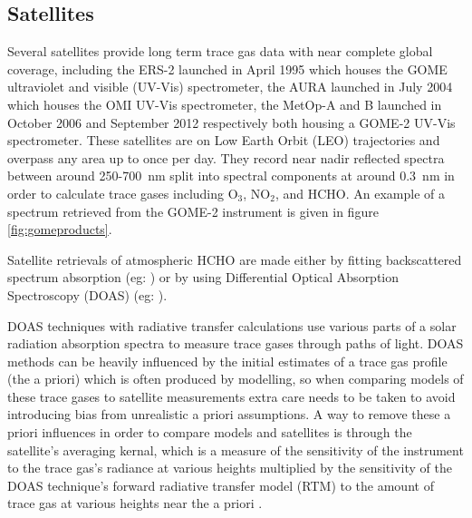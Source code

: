 \subsection{Satellites}

Several satellites provide long term trace gas data with near complete global coverage, including the ERS-2 launched in April 1995 which houses the GOME ultraviolet and visible (UV-Vis) spectrometer, the AURA launched in July 2004 which houses the OMI UV-Vis spectrometer, the MetOp-A and B launched in October 2006 and September 2012 respectively both housing a GOME-2 UV-Vis spectrometer.
These satellites are on Low Earth Orbit (LEO) trajectories and overpass any area up to once per day. 
They record near nadir reflected spectra between around 250-700~nm split into spectral components at around $0.3$~nm in order to calculate trace gases including O$_3$, NO$_2$, and HCHO.
An example of a spectrum retrieved from the GOME-2 instrument is given in figure \ref{fig:gomeproducts}.

Satellite retrievals of atmospheric HCHO are made either by fitting backscattered spectrum absorption (eg: \citet{Chance_2000}) or by using Differential Optical Absorption Spectroscopy (DOAS) (eg: \cite{Leue_2001}).

DOAS techniques with radiative transfer calculations use various parts of a solar radiation absorption spectra to measure trace gases through paths of light.
DOAS methods can be heavily influenced by the initial estimates of a trace gas profile (the a priori) which is often produced by modelling, so when comparing models of these trace gases to satellite measurements extra care needs to be taken to avoid introducing bias from unrealistic a priori assumptions.
A way to remove these a priori influences in order to compare models and satellites is through the satellite's averaging kernal, which is a measure of the sensitivity of the instrument to the trace gas's radiance at various heights multiplied by the sensitivity of the DOAS technique's forward radiative transfer model (RTM) to the amount of trace gas at various heights near the a priori \cite{Eskes_2003}.


